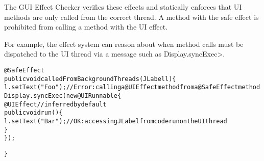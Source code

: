 
The GUI Effect Checker verifies these effects and statically enforces that UI methods are only
called from the correct thread.  A method with the safe effect is prohibited from calling a method
with the UI effect.

For example, the effect system can reason about when method calls must be dispatched to the UI
thread via a message such as \<Display.syncExec>.
\begin{alltt}
@SafeEffect
public void calledFromBackgroundThreads(JLabel l) \{
    l.setText("Foo");       // Error: calling a @UIEffect method from a @SafeEffect method
    Display.syncExec(new @UI Runnable \{
        @UIEffect // inferred by default
        public void run() \{
            l.setText("Bar");  // OK: accessing JLabel from code run on the UI thread
        \}
    \});

\}
\end{alltt}


